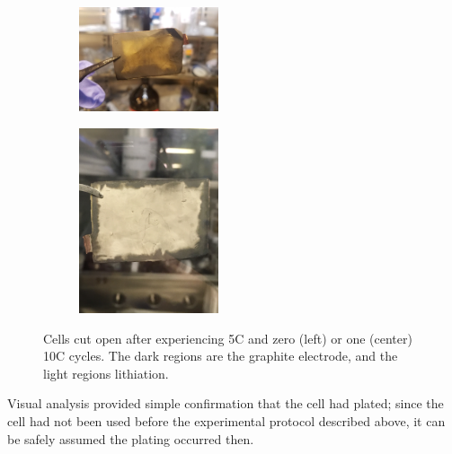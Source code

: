 \begin{figure}[h!]\label{fig:optical}
\centering
     \begin{subfigure}
         \centering
         \includegraphics[width=0.45\textwidth]{optical5c.JPG}
     \end{subfigure}
     \hfill
     \begin{subfigure}
         \centering
         \includegraphics[width=0.45\textwidth]{optical.JPG}
     \end{subfigure}
     \caption{Cells cut open after experiencing 5C and zero (left) or one (center) 10C cycles. The dark regions are the graphite electrode, and the light regions lithiation.}
\end{figure}

Visual analysis provided simple confirmation that the cell had plated; since the cell had not been used before the experimental protocol described above, it can be safely assumed the plating occurred then.

